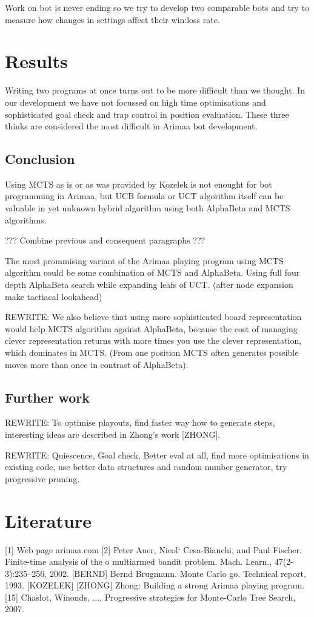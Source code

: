 \documentclass[12pt,titlepage,fleqn]{report}
\begin{document}
Work on bot is never ending so we try to develop two comparable bots and try to
measure how changes in settings affect their win:loss rate.

\chapter{Results}
Writing two programs at once turns out to be more difficult than we thought. In
our development we have not focussed on high time optimisations and
sophisticated goal check and trap control in position evaluation. These three
thinks are considered the most difficult in Arimaa bot development.

\section{Conclusion}
Using MCTS as is or as was provided by Kozelek is not enought for bot
programming in Arimaa, but UCB formula or UCT algorithm itself can be valuable
in yet unknown hybrid algorithm using both AlphaBeta and MCTS algorithms.

??? Combine previous and consequent paragraphs ???

The most prommising variant of the Arimaa playing program using MCTS algorithm
could be some combination of MCTS and AlphaBeta. Using full four depth
AlphaBeta search while expanding leafs of UCT. (after node expansion make
tactiacal lookahead)

REWRITE: We also believe that using more sophisticated board representation
would help MCTS algorithm against AlphaBeta, because the cost of managing
clever representation returns with more times you use the clever
representation, which dominates in MCTS. (From one position MCTS often
generates possible moves more than once in contrast of AlphaBeta).

\section{Further work}
REWRITE: To optimise playouts, find faster way how to generate steps,
interesting ideas are described in Zhong's work [ZHONG].

REWRITE: Quiescence, Goal check, Better eval at all, find more optimisations in
existing code, use better data structures and random number generator, try
progressive pruning.

\appendix
\chapter{Literature}
[1] Web page arimaa.com
[2] Peter Auer, Nicol` Cesa-Bianchi, and Paul Fischer. Finite-time analysis of
    the o multiarmed bandit problem. Mach. Learn., 47(2-3):235–256, 2002.
[BERND] Bernd Brugmann. Monte Carlo go. Technical report, 1993.
[KOZELEK]
[ZHONG]  Zhong: Building a strong Arimaa playing program.
[15] Chaslot, Winonds, ..., Progressive strategies for Monte-Carlo Tree Search, 2007.
\end{document}
